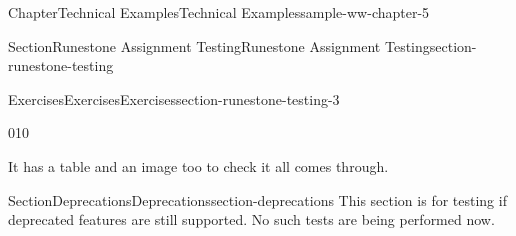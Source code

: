 \documentclass[oneside,10pt,]{book}
\newcommand{\blocktitlefont}{\relax}
\newlength{\fillinmaxwidth}
\newlength{\fillincontract}
\newlength{\charmaxwidth}\setlength{\charmaxwidth}{0.5em}
\newlength{\charminwidth}\setlength{\charminwidth}{0.1em}
\newlength{\fillinheight}
\newcommand{\fillintext}[1]{%
\setlength{\fillinmaxwidth}{#1\charmaxwidth}%
\setlength{\fillincontract}{#1\charminwidth}%
\setlength{\fillinheight}{\baselineskip}\addtolength{\fillinheight}{1.2pt}%
\strut\nobreak\leaders\vbox{\hrule width 0.3pt height 0.3pt \vskip -1.2pt}\hskip 1\fillinmaxwidth minus \fillincontract\nobreak\strut%
}
\numberwithin{equation}{section}
\providecommand\phantomsection{}
\begin{document}
\begin{chapterptx}{Chapter}{Technical Examples}{}{Technical Examples}{}{}{sample-ww-chapter-5}
\begin{sectionptx}{Section}{Runestone Assignment Testing}{}{Runestone Assignment Testing}{}{}{section-runestone-testing}
\begin{exercises-subsection-numberless}{Exercises}{Exercises}{}{Exercises}{}{}{section-runestone-testing-3}
\begin{image}{0}{1}{0}{}
{%
}%
\end{image}%
It has a table and an image too to check it all comes through.%
\begin{exercisegroup}
%
\end{exercisegroup}
\par\medskip\noindent
\end{exercises-subsection-numberless}
\end{sectionptx}
%
%
\typeout{************************************************}
\typeout{************************************************}
%
\begin{sectionptx}{Section}{Deprecations}{}{Deprecations}{}{}{section-deprecations}
This section is for testing if deprecated features are still supported. No such tests are being performed now.%
\end{sectionptx}
\end{chapterptx}
%
\appendix%
%
\clearpage\phantomsection%
%
%
%
\typeout{************************************************}
\typeout{************************************************}
%
\end{document}
